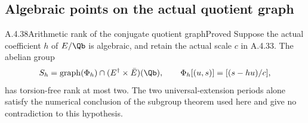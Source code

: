 \subsection{Algebraic points on the actual quotient graph}

\begin{result}{A.4.38}{Arithmetic rank of the conjugate quotient graph}{Proved}
Suppose the actual coefficient $h$ of $E/\Qb$ is algebraic, and
retain the actual scale $c$ in A.4.33. The abelian group
\[
 S_h=\operatorname{graph}(\Phi_h)\cap
                 (E^\dagger\times\bar E)(\Qb),\qquad
 \Phi_h[(u,s)]=[(s-hu)/c],
\]
has torsion-free rank at most two. The two universal-extension
periods alone satisfy the numerical conclusion of the subgroup
theorem used here and give no contradiction to this hypothesis.
\end{result}

